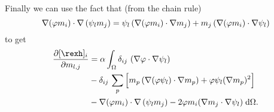 Finally we can use the fact that (from the chain rule)
\begin{equation}
  \nabla(\varphi m_i) \cdot \nabla \left( \psi_l m_j \right)
   = \psi_l \left(\nabla(\varphi m_i) \cdot \nabla m_j \right)
    + m_j \left(\nabla(\varphi m_i) \cdot \nabla \psi_l \right)
\end{equation}
to get
\begin{equation}
  \begin{aligned}
    \pd{[\rexh]_i}{m_{l,j}} &= \dampc \int_\magd
    \delta_{ij}\, \left(\nabla \tbf \cdot \nabla \sbf_l \right)
    \\
    &- \delta_{ij}\, \sum_p \Big[
      m_p \left(\nabla(\tbf \sbf_l) \cdot \nabla m_p \right)
      +\tbf \sbf_l (\nabla m_p)^2
      \Big]
    \\
    &- \nabla(\tbf m_i) \cdot \nabla \left( \sbf_l m_j \right)
    - 2 \tbf m_i (\nabla m_j \cdot \nabla \sbf_l) \d\magd.
  \end{aligned}
\end{equation}



